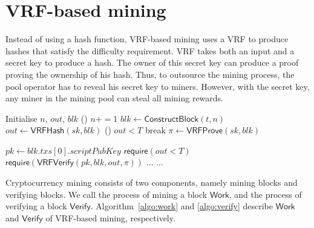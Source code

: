 \section{VRF-based mining}
\label{sec:construction}

Instead of using a hash function, VRF-based mining uses a VRF to produce hashes that satisfy the difficulty requirement.
VRF takes both an input and a secret key to produce a hash.
The owner of this secret key can produce a proof proving the ownership of his hash.
Thus, to outsource the mining process, the pool operator has to reveal his secret key to miners.
However, with the secret key, any miner in the mining pool can steal all mining rewards.

\begin{algorithm}[]
\caption{$\mathsf{Work}(sk, t, T)$.}\label{algo:work}
\SetAlgoLined\DontPrintSemicolon
{}
  Initialise $n$, $out$, $blk$ 
  \While () {$n += 1$}{
    $blk \gets \mathsf{ConstructBlock}(t, n)$ 
    $out \gets \mathsf{VRFHash}(sk, blk)$ 
    \If () {$out < T$}{
      break 
    }
  }
  $\pi \gets \mathsf{VRFProve}(sk, blk)$ 
   
\end{algorithm}



\begin{algorithm}[h]
\caption{$\mathsf{Verify}(blk, out, \pi, T)$}\label{algo:verify}
\SetAlgoLined\DontPrintSemicolon
$pk \gets blk . txs[0] . scriptPubKey$ 
$\mathsf{require}(out < T)$ 
$\mathsf{require}(\mathsf{VRFVerify}(pk, blk, out, \pi))$ \;
$\dots$ 
$\dots$ 
\end{algorithm}

Cryptocurrency mining consists of two components, namely mining blocks and verifying blocks.
We call the process of mining a block $\mathsf{Work}$, and the process of verifying a block $\mathsf{Verify}$.
Algorithm~\ref{algo:work} and \ref{algo:verify} describe $\mathsf{Work}$ and $\mathsf{Verify}$ of VRF-based mining, respectively.

